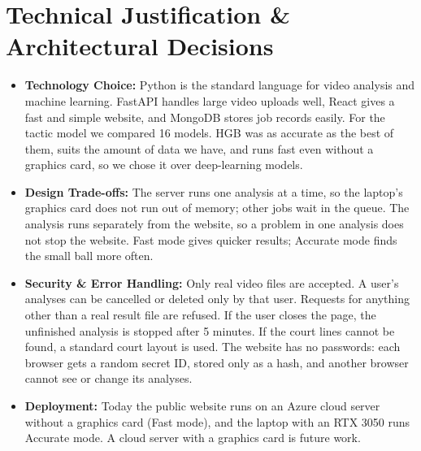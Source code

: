 \documentclass[11pt, a4paper]{article}
\begin{document}
\section{Technical Justification \& Architectural Decisions}
\begin{itemize}[noitemsep, topsep=2pt]
    \item \textbf{Technology Choice:} Python is the standard language for video analysis and machine learning. FastAPI handles large video uploads well, React gives a fast and simple website, and MongoDB stores job records easily. For the tactic model we compared 16 models. HGB was as accurate as the best of them, suits the amount of data we have, and runs fast even without a graphics card, so we chose it over deep-learning models.
    \item \textbf{Design Trade-offs:} The server runs one analysis at a time, so the laptop's graphics card does not run out of memory; other jobs wait in the queue. The analysis runs separately from the website, so a problem in one analysis does not stop the website. Fast mode gives quicker results; Accurate mode finds the small ball more often.
    \item \textbf{Security \& Error Handling:} Only real video files are accepted. A user's analyses can be cancelled or deleted only by that user. Requests for anything other than a real result file are refused. If the user closes the page, the unfinished analysis is stopped after 5 minutes. If the court lines cannot be found, a standard court layout is used. The website has no passwords: each browser gets a random secret ID, stored only as a hash, and another browser cannot see or change its analyses.
    \item \textbf{Deployment:} Today the public website runs on an Azure cloud server without a graphics card (Fast mode), and the laptop with an RTX 3050 runs Accurate mode. A cloud server with a graphics card is future work.
\end{itemize}
\end{document}
